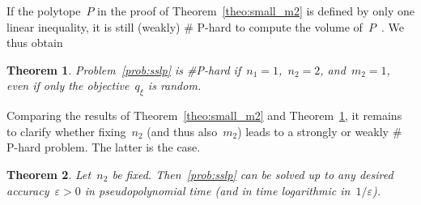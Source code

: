 \documentclass{article}
\newtheorem{theorem}{Theorem}
\newcommand{\card}{\#}
\begin{document}
If the polytope~$P$ in the proof of Theorem~\ref{theo:small_m2} is
defined by only one linear inequality, it is still (weakly) \card
P-hard to compute the volume of~$P$~\cite{Dyer88}. We thus obtain
\begin{theorem}\label{theo:small_n2}
  Problem~\eqref{prob:sslp} is \card P-hard if~$n_1=1$,~$n_2=2$,
  and~$m_2=1$, even if only the objective~$q_\xi$ is random.
\end{theorem}

Comparing the results of Theorem~\ref{theo:small_m2} and
Theorem~\ref{theo:small_n2}, it remains to clarify whether
fixing~$n_2$ (and thus also~$m_2$) leads to a strongly or weakly \card
P-hard problem. The latter is the case.
\begin{theorem}\label{theo:pseudo}
  Let~$n_2$ be fixed. Then~\eqref{prob:sslp} can be solved up to any
  desired accuracy~$\varepsilon>0$ in pseudopolynomial time (and in
  time logarithmic in~$1/\varepsilon$).
\end{theorem}
\end{document}
